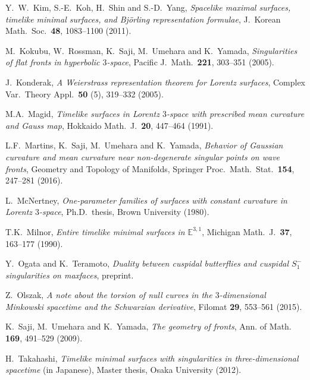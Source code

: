 \documentclass[11pt,reqno]{amsart}
\theoremstyle{plain} %
\theoremstyle{definition}
\begin{document}
\begin{thebibliography}{99}
Y.~W.~Kim, S.-E.~Koh, H.~Shin and S.-D.~Yang,
\emph{Spacelike maximal surfaces, timelike minimal surfaces, and Bj\"orling representation formulae}, J.\ Korean Math.\ Soc.\ {\bf 48}, 1083--1100 (2011).

M.~Kokubu, W.~Rossman, K.~Saji, M.~Umehara and K.~Yamada, 
\emph{Singularities of flat fronts in hyperbolic $3$-space}, Pacific J.\ Math.\ {\bf 221}, 303--351 (2005).

J.~Konderak,
\emph{A Weierstrass representation theorem for Lorentz surfaces}, Complex Var.\ Theory Appl.\ {\bf 50} (5), 319--332 (2005).



M.A.~Magid,
\emph{Timelike surfaces in Lorentz $3$-space with prescribed mean curvature and Gauss map}, Hokkaido Math.\ J.\ {\bf 20}, 447--464 (1991).

L.F.~Martins, K.~Saji, M.~Umehara and K.~Yamada, 
\emph{Behavior of Gaussian curvature and mean curvature near non-degenerate singular points on wave fronts}, Geometry and Topology of Manifolds, Springer Proc.\ Math.\ Stat.\ {\bf 154}, 247--281 (2016).

L.~McNertney, 
\emph{One-parameter families of surfaces with constant curvature in Lorentz $3$-space}, Ph.D.\ thesis, Brown University (1980).

T.K.~Milnor,
\emph{Entire timelike minimal surfaces in $\mathbb{E}^{3,1}$}, Michigan Math.\ J.\ {\bf 37}, 163--177 (1990).

Y.~Ogata and K.~Teramoto,
\emph{Duality between cuspidal butterflies and cuspidal $S_1^{-}$ singularities on maxfaces}, preprint.
  
Z.~Olszak,
\emph{A note about the torsion of null curves in the $3$-dimensional Minkowski spacetime and the Schwarzian derivative}, Filomat {\bf 29}, 553--561 (2015).
  
K.~Saji, M.~Umehara and K.~Yamada, 
\emph{The geometry of fronts}, Ann. of Math. {\bf 169}, 491--529 (2009).

H.~Takahashi, 
\emph{Timelike minimal surfaces with singularities in three-dimensional spacetime} (in Japanese), Master thesis, Osaka University (2012).


\end{thebibliography}
\end{document}
